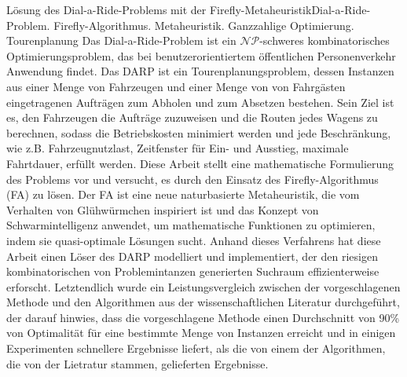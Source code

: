 \documentclass[tuberlin,cic,tc,openright,english,noabntcite,oneside]{iiufrgs}
\begin{document}
\begin{englishabstract}{Lösung des Dial-a-Ride-Problems mit der Firefly-Metaheuristik}{Dial-a-Ride-Problem. Firefly-Algorithmus. Metaheuristik. Ganzzahlige Optimierung. Tourenplanung}
Das Dial-a-Ride-Problem ist ein $\mathcal{NP}$-schweres kombinatorisches Optimierungsproblem, das bei benutzerorientiertem öffentlichen Personenverkehr Anwendung findet. Das DARP ist ein Tourenplanungsproblem, dessen Instanzen aus einer Menge von Fahrzeugen und einer Menge von von Fahrgästen eingetragenen Aufträgen zum Abholen und zum Absetzen bestehen. Sein Ziel ist es, den Fahrzeugen die Aufträge zuzuweisen und die Routen jedes Wagens zu berechnen, sodass die Betriebskosten minimiert werden und jede Beschränkung, wie z.B. Fahrzeugnutzlast, Zeitfenster für Ein- und Ausstieg, maximale Fahrtdauer, erfüllt werden. Diese Arbeit stellt eine mathematische Formulierung des Problems vor und versucht, es durch den Einsatz des Firefly-Algorithmus (FA) zu lösen. Der FA ist eine neue naturbasierte Metaheuristik, die vom Verhalten von Glühwürmchen inspiriert ist und das Konzept von Schwarmintelligenz anwendet, um mathematische Funktionen zu optimieren, indem sie quasi-optimale Lösungen sucht. Anhand dieses Verfahrens hat diese Arbeit einen Löser des DARP modelliert und implementiert, der den riesigen kombinatorischen von Problemintanzen generierten Suchraum effizienterweise erforscht. Letztendlich wurde ein Leistungsvergleich zwischen der vorgeschlagenen Methode und den Algorithmen aus der wissenschaftlichen Literatur durchgeführt, der darauf hinwies, dass die vorgeschlagene Methode einen Durchschnitt von 90\% von Optimalität für eine bestimmte Menge von Instanzen erreicht und in einigen Experimenten schnellere Ergebnisse liefert, als die von einem der Algorithmen, die von der Lietratur stammen, gelieferten Ergebnisse.
\end{englishabstract}

\listoffigures

\listoftables
\end{document}
